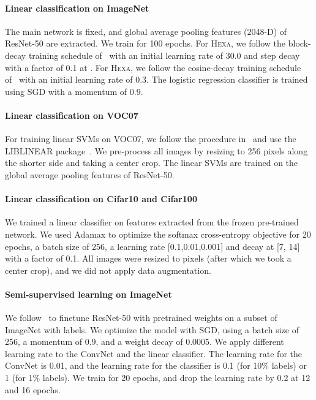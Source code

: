 \documentclass[10pt,twocolumn,letterpaper]{article}
\newcommand{\shortname}{\textsc{Hexa}}
\begin{document}
\paragraph{Linear classification on ImageNet}
The main network is fixed, and global average pooling features (2048-D) of ResNet-50 are extracted. We train for 100 epochs. For \shortname{}, we follow the block-decay training schedule of~\cite{he2020momentum,chen2020improved} with an initial
learning rate of 30.0 and step decay with a factor of 0.1 at .
For  \shortname{}, we follow the cosine-decay training schedule of~\cite{caron2020unsupervised} with an initial learning rate of 0.3. The logistic regression classifier is trained using SGD with a momentum of 0.9. 



\paragraph{Linear classification  on VOC07}
For training linear SVMs on VOC07, we follow the procedure in~\cite{goyal2019scaling,li2020prototypical} and use the LIBLINEAR package~\cite{fan2008liblinear}. We pre-process all images by resizing to 256 pixels along the shorter side and taking a  center crop. The linear SVMs are trained on the global average pooling features of ResNet-50.


\paragraph{Linear classification on Cifar10 and Cifar100}
We trained a linear classifier on features extracted from the frozen pre-trained network. We used Adamax to optimize the softmax cross-entropy objective for 20 epochs, a batch size of 256, a learning rate [0.1,0.01,0.001] and decay at [7, 14] with a factor of 0.1. All images were resized to  pixels (after which we took a  center crop), and we did not apply data augmentation. 




\paragraph{Semi-supervised learning on ImageNet} We follow~\cite{caron2020unsupervised} to finetune ResNet-50 with pretrained weights on a subset of ImageNet with labels. We optimize the model with SGD, using a batch size of 256, a momentum of 0.9, and a weight decay of 0.0005. We apply different learning rate to the ConvNet and the linear classifier. The learning rate for the ConvNet is 0.01, and the learning rate for the classifier is 0.1 (for 10\% labels) or 1 (for 1\% labels). We train for 20 epochs, and drop the learning rate by 0.2 at 12 and 16 epochs.
\end{document}
